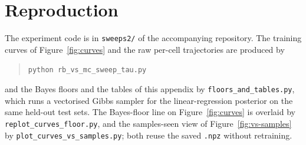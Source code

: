 \section{Reproduction}
\label{app:reproduction}

The experiment code is in \texttt{sweeps2/} of the accompanying
repository. The training curves of Figure~\ref{fig:curves} and the raw
per-cell trajectories are produced by
%
\begin{quote}
\texttt{python rb\_vs\_mc\_sweep\_tau.py}
\end{quote}
%
and the Bayes floors and the tables of this appendix by
\texttt{floors\_and\_tables.py}, which runs a vectorised Gibbs sampler
for the linear-regression posterior on the same held-out test sets. The
Bayes-floor line on Figure~\ref{fig:curves} is overlaid by
\texttt{replot\_curves\_floor.py}, and the samples-seen view of
Figure~\ref{fig:vs-samples} by \texttt{plot\_curves\_vs\_samples.py};
both reuse the saved \texttt{.npz} without retraining.
